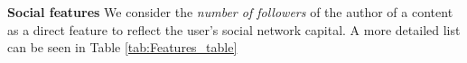 	\noindent\textbf{Social  features} We consider the \emph{number of followers} of  the author of a content as a direct feature to reflect the user's social network capital. 
	A more detailed list can be seen in  Table \ref{tab:Features_table}

%
%
